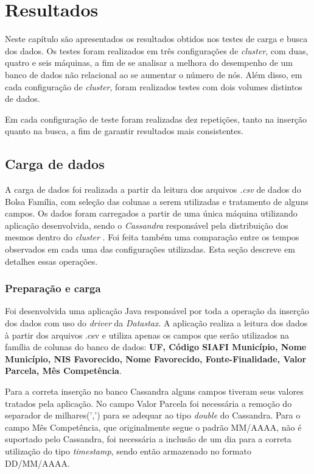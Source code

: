 \chapter{Resultados}

Neste capítulo são apresentados os resultados obtidos nos testes de carga e busca dos dados. Os testes foram realizados em três configurações de \emph{cluster}, com duas, quatro e seis máquinas, a fim de se analisar a melhora do desempenho de um banco de dados não relacional ao se aumentar o número de nós. Além disso, em cada configuração de \emph{cluster}, foram realizados testes com dois volumes distintos de dados.

Em cada configuração de teste foram realizadas dez repetições, tanto na inserção quanto na busca, a fim de garantir resultados mais consistentes. 

\section{Carga de dados}
A carga de dados foi realizada a partir da leitura dos arquivos \emph{.csv} de dados do Bolsa Família, com seleção das colunas a serem utilizadas e tratamento de alguns campos.
Os dados foram carregados a partir de uma única máquina utilizando aplicação desenvolvida, sendo o \emph{Cassandra} responsável pela distribuição dos mesmos dentro do \emph{cluster} . Foi feita também uma comparação entre os tempos observados em cada uma das configurações utilizadas. Esta seção descreve em detalhes essas operações.

\subsection{Preparação e carga}
Foi desenvolvida uma aplicação Java responsável por toda a operação da inserção dos dados com uso do \emph{driver} da \emph{Datastax}. A aplicação realiza a leitura dos dados à partir dos arquivos .csv e utiliza apenas os campos que serão utilizados na família de colunas do banco de dados: \textbf{UF, Código SIAFI Município, Nome Município, NIS Favorecido, Nome Favorecido, Fonte-Finalidade, Valor Parcela, Mês Competência}. 

Para a correta inserção no banco Cassandra alguns campos tiveram seus valores tratados pela aplicação. No campo Valor Parcela foi necessária a remoção do separador de milhares(',') para se adequar ao tipo \emph{double} do Cassandra. Para o campo Mês Competência, que originalmente segue o padrão MM/AAAA, não é suportado pelo Cassandra, foi necessária a inclusão de um dia para a correta utilização do tipo \emph{timestamp}, sendo então armazenado no formato DD/MM/AAAA.

